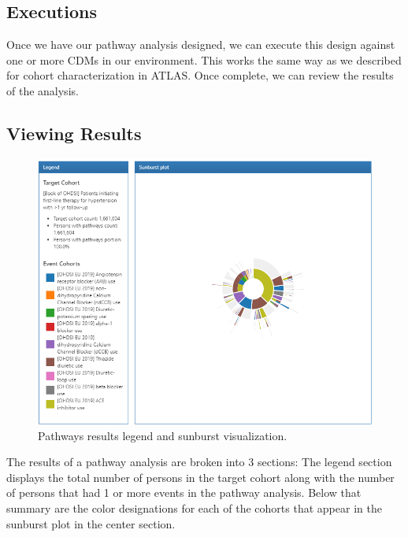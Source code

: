 \documentclass[11pt]{book}
\theoremstyle{definition}
\theoremstyle{definition}
\theoremstyle{definition}
\theoremstyle{remark}
\begin{document}
\hypertarget{executions-1}{%
\subsection{Executions}\label{executions-1}}

Once we have our pathway analysis designed, we can execute this design against one or more CDMs in our environment. This works the same way as we described for cohort characterization in ATLAS. Once complete, we can review the results of the analysis.

\hypertarget{viewing-results}{%
\subsection{Viewing Results}\label{viewing-results}}

\begin{figure}

{\centering \includegraphics[width=1\linewidth]{images/Characterization/atlasPathwaysResults} 

}

\caption{Pathways results legend and sunburst visualization.}\label{fig:atlasPathwaysResults}
\end{figure}

The results of a pathway analysis are broken into 3 sections: The legend section displays the total number of persons in the target cohort along with the number of persons that had 1 or more events in the pathway analysis. Below that summary are the color designations for each of the cohorts that appear in the sunburst plot in the center section.
\end{document}
